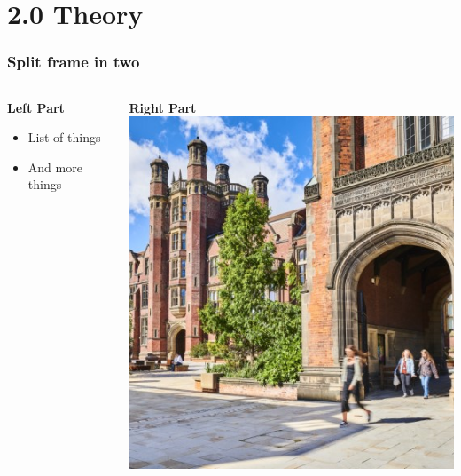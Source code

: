 \documentclass[t,compress,9pt,aspectratio=169]{beamer}
\begin{document}
\section{2.0 Theory}
\begin{frame}[fragile]
  \frametitle{Split frame in two}
  
    \begin{columns}[T] %
      \begin{column}{.45\textwidth}
        \textbf{Left Part}
            \begin{itemize}
              \item{List of things}
              \item{And more things}
          \end{itemize}
      \end{column}%
      
      \hfill%
      \begin{column}{.45\textwidth}
        \textbf{Right Part} \\
        \includegraphics[scale = 0.45]{figures/ncl_campus.jpg}
      \end{column}%
    \end{columns}
\end{frame}
\end{document}
